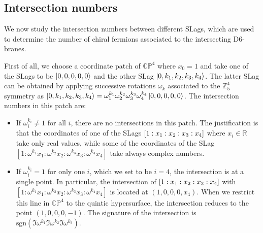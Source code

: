 \subsection{Intersection numbers}
We now study the intersection numbers between different SLags, which are used to determine the number 
of chiral fermions associated to the intersecting D6-branes.

First of all, we choose a coordinate patch of $\mathbb{CP}^4$ where $x_0=1$ and take one of the SLags to be $\ket{0,0,0,0,0}$
and the other SLag $\ket{0,k_1,k_2,k_3,k_4}$.
The latter SLag can  be  obtained by applying successive rotations $\omega_k$ associated to the $\mathbb Z_5^4$ symmetry
as $\ket{0,k_1,k_2,k_3,k_4}=\omega^{k_1}_1\omega^{k_2}_2\omega^{k_3}_3\omega^{k_4}_4\ket{0,0,0,0,0}$.
The intersection numbers in this patch are:
\begin{itemize}
  \item If $\omega_i^{k_i}\neq 1$ for all $i$, there are no intersections in this patch. 
    The justification is that the coordinates of one of the SLags $\qty[1:x_1:x_2:x_3:x_4]$ where $x_i\in\mathbb R$ take only real values,
    while some of the coordinates of the SLag $[1:\omega^{k_1}x_1:\omega^{k_2}x_2:\omega^{k_3}x_3:\omega^{k_4}x_4]$ take
    always complex numbers.

  \item If $\omega_i^{k_i}= 1$ for only one $i$, which we set to be $i=4$, the intersection 
    is at a single point.
    In particular, the intersection of $\qty[1:x_1:x_2:x_3:x_4]$ with $[1:\omega^{k_1}x_1:\omega^{k_2}x_2:\omega^{k_3}x_3:\omega^{k_4}x_4]$
    is located at $(1,0,0,0,x_4)$. 
    When we restrict this line in $\mathbb{CP}^4$ to the quintic hypersurface, the intersection reduces to the point $(1,0,0,0,-1)$.
    The signature of the intersection is $\mathrm{sgn}(\Im \omega^{k_1}\Im\omega^{k_2}\Im\omega^{k_3})$. 


\end{itemize}
